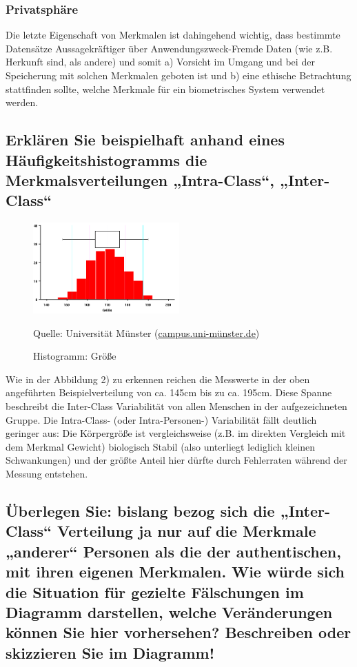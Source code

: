 \documentclass{article}
\newcommand{\figuresource}[1]{
	\begin{center}Quelle: {#1}\end{center}
}
\begin{document}
\subsubsection*{Privatsphäre}

Die letzte Eigenschaft von Merkmalen ist dahingehend wichtig, dass bestimmte Datensätze Aussagekräftiger 
über Anwendungszweck-Fremde Daten (wie z.B. Herkunft sind, als andere) und somit a) Vorsicht im Umgang und 
bei der Speicherung mit solchen Merkmalen geboten ist und b) eine ethische Betrachtung stattfinden sollte, 
welche Merkmale für ein biometrisches System verwendet werden.

\newpage

\subsection{Erklären Sie beispielhaft anhand eines Häufigkeitshistogramms die Merkmalsverteilungen „Intra-Class“, „Inter-Class“}


\begin{figure}[ht]
	\includegraphics[width=0.5\textwidth]{assets/histogramm}
	\centering
	\caption{Histogramm: Größe}
	\figuresource{Universität Münster 
		(\href{https://campus.uni-muenster.de/fileadmin/einrichtung/ibkf/lehre/skripte/biomathe/bio/eda/help/eda15.html}{campus.uni-münster.de})
	}
\end{figure}

Wie in der Abbildung 2) zu erkennen reichen die Messwerte in der oben angeführten Beispielverteilung
von ca. 145cm bis zu ca. 195cm. Diese Spanne beschreibt die Inter-Class Variabilität von allen Menschen
in der aufgezeichneten Gruppe. Die Intra-Class- (oder Intra-Personen-) Variabilität fällt deutlich 
geringer aus: Die Körpergröße ist vergleichsweise (z.B. im direkten Vergleich mit dem Merkmal Gewicht)
biologisch Stabil (also unterliegt lediglich kleinen Schwankungen) und der größte Anteil hier
dürfte durch Fehlerraten während der Messung entstehen.

\subsection{Überlegen Sie: bislang bezog sich die „Inter-Class“ Verteilung ja nur auf die Merkmale „anderer“ Personen als die der authentischen, mit ihren eigenen Merkmalen. Wie würde sich die Situation für gezielte Fälschungen im Diagramm darstellen, welche Veränderungen können Sie hier vorhersehen? Beschreiben oder skizzieren Sie im Diagramm!}
\end{document}
